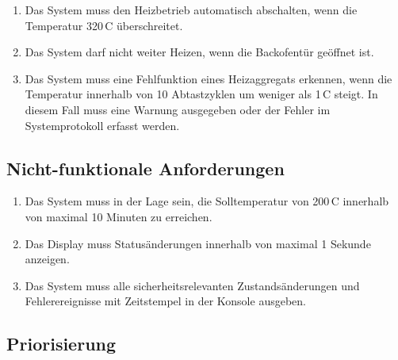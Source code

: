 \documentclass[a4paper,12pt]{article}
\begin{document}
\begin{enumerate}[label=\textbf{R-2.\arabic*}, ref=R-2.\arabic*, itemsep=0pt, topsep=0pt, font=\bfseries]
    \item \label{req:2.1} Das System muss den Heizbetrieb automatisch abschalten, wenn die Temperatur 320\,\textdegree{}C überschreitet.
    \item \label{req:2.2} Das System darf nicht weiter Heizen, wenn die Backofentür geöffnet ist.
    \item \label{req:2.3} Das System muss eine Fehlfunktion eines Heizaggregats erkennen, wenn die Temperatur innerhalb von 10 Abtastzyklen um weniger als 1\,\textdegree{}C steigt. In diesem Fall muss eine Warnung ausgegeben oder der Fehler im Systemprotokoll erfasst werden.
\end{enumerate}

\subsection{Nicht-funktionale Anforderungen}

\begin{enumerate}[label=\textbf{R-3.\arabic*}, ref=R-3.\arabic*, itemsep=0pt, topsep=0pt, font=\bfseries]
    \item \label{req:3.1} Das System muss in der Lage sein, die Solltemperatur von 200\,\textdegree{}C innerhalb von maximal 10 Minuten zu erreichen.
    \item \label{req:3.2} Das Display muss Statusänderungen innerhalb von maximal 1 Sekunde anzeigen.
    \item \label{req:3.3} Das System muss alle sicherheitsrelevanten Zustandsänderungen und Fehlerereignisse mit Zeitstempel in der Konsole ausgeben.
\end{enumerate}

\subsection{Priorisierung}
\end{document}
